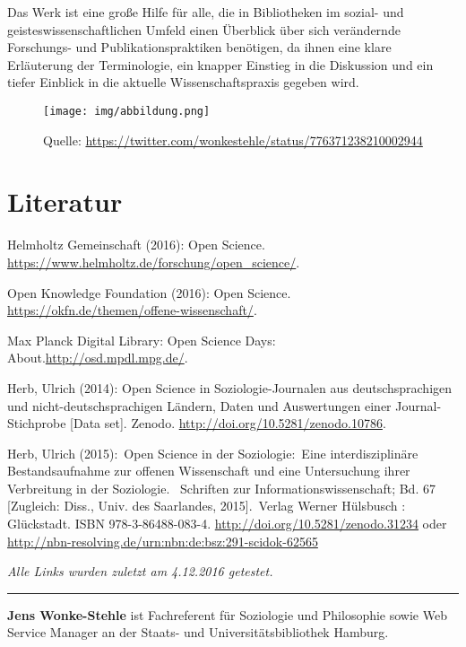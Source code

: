 \documentclass[a4paper,
fontsize=11pt,
oneside,
numbers=noperiodatend,
parskip=half-,
bibliography=totoc,
final
]{scrartcl}
\begin{document}
Das Werk ist eine große Hilfe für alle, die in Bibliotheken im sozial-
und geisteswissenschaftlichen Umfeld einen Überblick über sich
verändernde Forschungs- und Publikationspraktiken benötigen, da ihnen
eine klare Erläuterung der Terminologie, ein knapper Einstieg in die
Diskussion und ein tiefer Einblick in die aktuelle Wissenschaftspraxis
gegeben wird.

\begin{figure}
\centering
\texttt{[image: img/abbildung.png]}
\caption{Quelle:
\url{https://twitter.com/wonkestehle/status/776371238210002944}}
\end{figure}

\section*{Literatur}\label{literatur}

Helmholtz Gemeinschaft (2016): Open Science.
\url{https://www.helmholtz.de/forschung/open_science/}.

Open Knowledge Foundation (2016): Open Science.
\url{https://okfn.de/themen/offene-wissenschaft/}.

Max Planck Digital Library: Open Science Days:
About.\url{http://osd.mpdl.mpg.de/}.

Herb, Ulrich (2014): Open Science in Soziologie-Journalen aus
deutschsprachigen und nicht-deutschsprachigen Ländern, Daten und
Auswertungen einer Journal-Stichprobe {[}Data set{]}. Zenodo.
\url{http://doi.org/10.5281/zenodo.10786}.

Herb, Ulrich (2015):~Open Science in der Soziologie:~Eine
interdisziplinäre Bestandsaufnahme zur offenen Wissenschaft und eine
Untersuchung ihrer Verbreitung in der Soziologie. ~Schriften zur
Informationswissenschaft; Bd. 67 {[}Zugleich: Diss., Univ. des
Saarlandes, 2015{]}.~Verlag Werner Hülsbusch : Glückstadt. ISBN
978-3-86488-083-4. \url{http://doi.org/10.5281/zenodo.31234} oder
\url{http://nbn-resolving.de/urn:nbn:de:bsz:291-scidok-62565}

\emph{Alle Links wurden zuletzt am 4.12.2016 getestet.}

\begin{center}\rule{0.5\linewidth}{\linethickness}\end{center}

\textbf{Jens Wonke-Stehle} ist Fachreferent für Soziologie und
Philosophie sowie Web Service Manager an der Staats- und
Universitätsbibliothek Hamburg.
\end{document}
